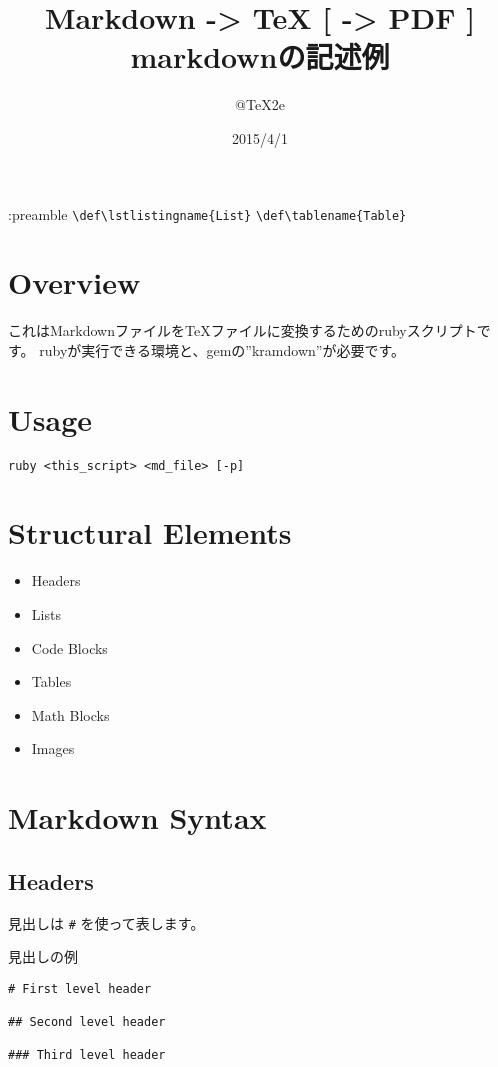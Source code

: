 \documentclass[a4j, titlepage]{jarticle}
\title{ \Huge Markdown -\textgreater{} TeX [ -\textgreater{} PDF ] \\{\LARGE markdownの記述例}}
\author{ \Large @TeX2e }
\date{ \Large 2015/4/1 }
\begin{document}
\maketitle
\thispagestyle{empty}
\newpage
\setcounter{page}{1}

:preamble
	{\tt \textbackslash{}def\textbackslash{}lstlistingname\{List\}}
	{\tt \textbackslash{}def\textbackslash{}tablename\{Table\}}

\fi
\section{Overview}

これはMarkdownファイルをTeXファイルに変換するためのrubyスクリプトです。
rubyが実行できる環境と、gemの''kramdown''が必要です。

\section{Usage}

\begin{screen}
\begin{verbatim}
ruby <this_script> <md_file> [-p]
\end{verbatim}
\end{screen}

\section{Structural Elements}

\begin{itemize}
\item Headers
\item Lists
\item Code Blocks
\item Tables
\item Math Blocks
\item Images
\end{itemize}

\section{Markdown Syntax}

\subsection{Headers}

見出しは {\tt \#} を使って表します。

\begin{itembox}[c]{見出しの例}
\begin{verbatim}
# First level header

## Second level header

### Third level header
\end{verbatim}
\end{itembox}
\end{document}

